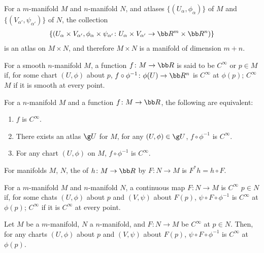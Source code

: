 For a $m$-manifold $M$ and $n$-manifold $N$, and atlases $\{(U_\alpha,\phi_\alpha)\}$ of $M$ and $\{(V_{\alpha'},\psi_{\alpha'})\}$ of $N$, the collection
\begin{align*}
  \{(U_\alpha \times V_{\alpha'}, \phi_\alpha \times \psi_{\alpha'} \colon U_\alpha \times V_{\alpha'} \to \bb R^m \times \bb R^n)\}
\end{align*}
is an atlas on $M \times N$, and therefore $M\times N$ is a manifold of dimension $m + n$.

For a smooth $n$-manifold $M$, a function $f \colon M \to \bb R$ is said to be $C^\infty$ or  $p \in M$ if, for some chart $(U,\phi)$ about $p$, $f \circ \phi^{-1} \colon \phi(U) \to \bb R^n$ is $C^\infty$ at $\phi(p)$; $C^\infty$  $M$ if it is smooth at every point.

For a $n$-manifold $M$ and a function $f \colon M \to \bb R$, the following are equivalent:
\begin{enumerate}
\item $f$ is $C^\infty$.
\item There exists an atlas $\g U$ for $M$, for any $(U, \phi) \in \g U$, $f \circ \phi^{-1}$ is $C^\infty$.
\item For any chart $(U,\phi)$ on $M$, $f \circ \phi^{-1}$ is $C^\infty$.
\end{enumerate}

For manifolds $M$, $N$, the  of $h \colon M \to \bb R$ by $F \colon N \to M$ is $F^* h = h \circ F$.

For a $m$-manifold $M$ and $n$-manifold $N$, a continuous map $F \colon N \to M$ is $C^\infty$  $p \in N$ if, for some chats $(U, \phi)$ about $p$ and $(V, \psi)$ about $F(p)$, $\psi \circ F \circ \phi^{-1}$ is $C^\infty$ at $\phi(p)$; $C^\infty$ if it is $C^\infty$ at every point.

Let $M$ be a $m$-manifold, $N$ a $n$-manifold, and $F \colon N \to M$ be $C^\infty$ at $p \in N$. Then, for any charts $(U, \phi)$ about $p$ and $(V,\psi)$ about $F(p)$, $\psi \circ F \circ \phi^{-1}$ is $C^\infty$ at $\phi(p)$.

